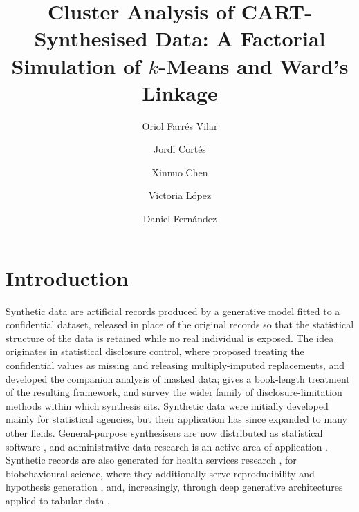 \documentclass[pdflatex,referee]{sn-jnl}
\begin{document}
\title{Cluster Analysis of CART-Synthesised Data: A Factorial Simulation of
       $k$-Means and Ward's Linkage}

\author[1]{Oriol Farr\'es Vilar}
\author[2]{Jordi Cort\'es}
\author[3]{Xinnuo Chen}
\author[4]{Victoria L\'opez}
\author[2]{Daniel Fern\'andez}


\abstract{}


\maketitle

\section{Introduction}

Synthetic data are artificial records produced by a generative model fitted to
a confidential dataset, released in place of the original records so that the
statistical structure of the data is retained while no real individual is
exposed. The idea originates in statistical disclosure control, where
\citet{rubin1993} proposed treating the confidential values as missing and
releasing multiply-imputed replacements, and \citet{little1993} developed the
companion analysis of masked data; \citet{drechsler2011} gives a book-length
treatment of the resulting framework, and \citet{matthews2011} survey the wider
family of disclosure-limitation methods within which synthesis sits. Synthetic
data were initially developed mainly for statistical agencies, but their
application has since expanded to many other fields. General-purpose
synthesisers are now distributed as statistical software
\citep{nowok2016,templ2017}, and administrative-data research is an active
area of application \citep{kokosi2022}. Synthetic records are also generated
for health services research \citep{gonzales2023,giuffre2023}, for
biobehavioural science, where they additionally serve reproducibility and
hypothesis generation \citep{quintana2020}, and, increasingly, through deep
generative architectures applied to tabular data \citep{goyal2024,zhao2024}.
\end{document}
